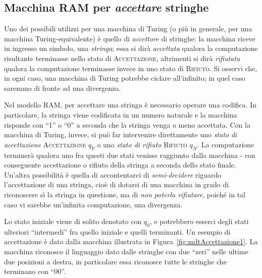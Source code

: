 \documentclass[10pt]{book}
\begin{document}
\clearpage


\subsection{Macchina RAM per \emph{accettare} stringhe}

Uno dei possibili utilizzi per una macchina di Turing (o più in generale, per
una macchina Turing-equivalente) è quello di \emph{accettore} di stringhe: la
macchina riceve in ingresso un simbolo, una \emph{stringa}; essa si dirà
\emph{accettata} qualora la computazione risultante terminasse nello stato di
\textsc{Accettazione}, altrimenti si dirà \emph{rifiutata} qualora la
computazione terminasse invece in uno stato di \textsc{Rifiuto}. Si osservi
che, in ogni caso, una macchina di Turing potrebbe ciclare all'infinito; in
quel caso saremmo di fronte ad una divergenza.

Nel modello RAM, per accettare una stringa è necessario operare una codifica.
In particolare, la stringa viene codificata in un numero naturale e la macchina
risponde con ``1'' o ``0'' a seconda che la stringa venga o meno accettata. Con
la macchina di Turing, invece, si può far intervenire direttamente uno
\emph{stato di accettazione} \textsc{Accettazione} $q_Y$ o uno \emph{stato di
rifiuto} \textsc{Rifiuto} $q_N$. La computazione terminerà qualora uno fra
questi due stati venisse raggiunto dalla macchina \-- con conseguente
accettazione o rifiuto della stringa a seconda dello stato finale. Un'altra
possibilità è quella di accontentarci di \emph{semi-decidere} riguardo
l'accettazione di una stringa, cioè di dotarsi di una macchina in grado di
riconoscere sì la stringa in questione, ma di \emph{non poterla rifiutare},
poiché in tal caso vi sarebbe un'infinita computazione, una divergenza. 

Lo stato iniziale viene di solito denotato con $q_0$, e potrebbero esserci degli
stati ulteriori ``intermedi'' fra quello iniziale e quelli terminanti. Un
esempio di accettazione è dato dalla macchina illustrata in
Figura~\ref{fig:mdtAccettazione1}. La macchina riconosce il linguaggio dato
dalle stringhe con due ``zeri'' nelle ultime due posizioni a destra, in
particolare essa riconosce tutte le stringhe che terminano con ``00''.
\end{document}

